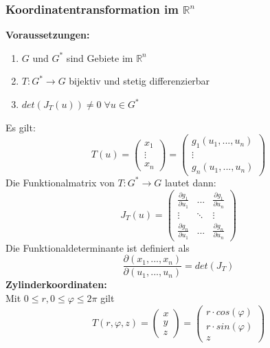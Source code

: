 \documentclass[a4paper,twocolumn,10pt]{article}
\begin{document}
\subsubsection{Koordinatentransformation im $\mathbb{R}^n$}
\textbf{Voraussetzungen:}
\begin{enumerate}[label=$\bullet$]
\item $G$ und $G^*$ sind Gebiete im $\mathbb{R}^n$
\item $T:G^*\rightarrow G$ bijektiv und stetig differenzierbar
\item $det(J_T(u))\neq 0\;\forall u\in G^*$
\end{enumerate}
Es gilt:
\begin{equation*}
T(u)=\begin{pmatrix}x_1 \\ \vdots \\ x_n\end{pmatrix}=\begin{pmatrix}g_1(u_1,...,u_n) \\ \vdots \\ g_n(u_1,...,u_n)\end{pmatrix}
\end{equation*}
Die Funktionalmatrix von $T:G^*\rightarrow G$ lautet dann:
\begin{equation*}
J_T(u)=\begin{pmatrix}\frac{\partial g_1}{\partial u_1} & ... & \frac{\partial g_1}{\partial u_n} \\ \vdots & \ddots & \vdots \\ \frac{\partial g_n}{\partial u_1} & ... & \frac{\partial g_n}{\partial u_n}\end{pmatrix}
\end{equation*}
Die Funktionaldeterminante ist definiert als
\begin{equation*}
\frac{\partial (x_1,...,x_n)}{\partial (u_1,...,u_n)}=det(J_T)
\end{equation*}
\textbf{Zylinderkoordinaten:}\\
Mit $0\leq r, 0\leq \varphi\leq 2\pi$ gilt
\begin{equation*}
T(r,\varphi,z)=\begin{pmatrix}x \\ y \\ z\end{pmatrix}=\begin{pmatrix}r\cdot cos(\varphi) \\ r\cdot sin(\varphi) \\ z\end{pmatrix}
\end{equation*}
\end{document}
